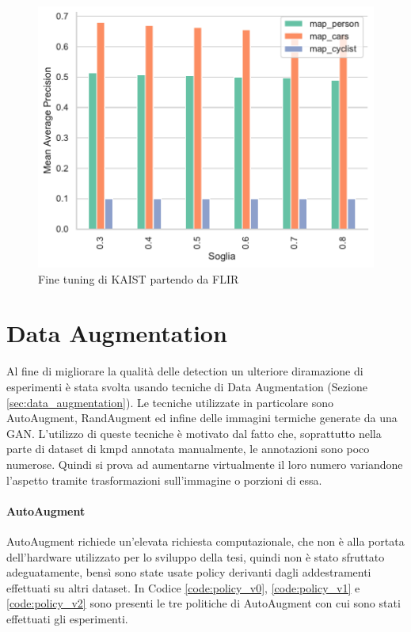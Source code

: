 \begin{figure}[]
    \centering
    \includegraphics[width=\textwidth]{images/graphic/graphics_map.pdf}
    \caption{Fine tuning di KAIST partendo da FLIR}
    \label{fig:test_kaist_ep8_map}
\end{figure}

\section{Data Augmentation}
\label{sec:data_augmentaion_experiment}
Al fine di migliorare la qualità delle detection un ulteriore diramazione di esperimenti è stata svolta usando tecniche di Data Augmentation (Sezione \ref{sec:data_augmentation}). Le tecniche utilizzate in particolare sono AutoAugment, RandAugment ed infine delle immagini termiche generate da una \ac{GAN}. L'utilizzo di queste tecniche è motivato dal fatto che, soprattutto nella parte di dataset di \ac{kmpd} annotata manualmente, le annotazioni sono poco numerose. Quindi si prova ad aumentarne virtualmente il loro numero variandone l'aspetto tramite trasformazioni sull'immagine o porzioni di essa.
\paragraph{AutoAugment}
AutoAugment richiede un'elevata richiesta computazionale, che non è alla portata dell'hardware utilizzato per lo sviluppo della tesi, quindi non è stato sfruttato adeguatamente, bensì sono state usate policy derivanti dagli addestramenti effettuati su altri dataset. 
In Codice \ref{code:policy_v0}, \ref{code:policy_v1} e \ref{code:policy_v2} sono presenti le tre politiche di AutoAugment con cui sono stati effettuati gli esperimenti.  

